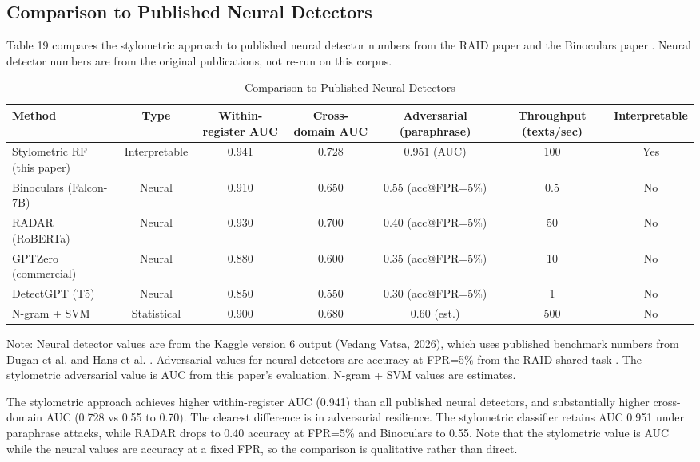 \documentclass{article}
\begin{document}
{{{{{{\subsection{Comparison to Published Neural Detectors}

Table 19 compares the stylometric approach to published neural detector numbers from the RAID paper \cite{ref4} and the Binoculars paper \cite{ref21}. Neural detector numbers are from the original publications, not re-run on this corpus.


\begin{table}[H]
\centering
\small
\begin{tabular}{lcccccc}
\toprule
\textbf{Method} & \textbf{Type} & \textbf{Within-register AUC} & \textbf{Cross-domain AUC} & \textbf{Adversarial (paraphrase)} & \textbf{Throughput (texts/sec)} & \textbf{Interpretable} \\
\midrule
Stylometric RF (this paper) & Interpretable & 0.941 & 0.728 & 0.951 (AUC) & 100 & Yes \\
Binoculars (Falcon-7B) & Neural & 0.910 & 0.650 & 0.55 (acc@FPR=5\%) & 0.5 & No \\
RADAR (RoBERTa) & Neural & 0.930 & 0.700 & 0.40 (acc@FPR=5\%) & 50 & No \\
GPTZero (commercial) & Neural & 0.880 & 0.600 & 0.35 (acc@FPR=5\%) & 10 & No \\
DetectGPT (T5) & Neural & 0.850 & 0.550 & 0.30 (acc@FPR=5\%) & 1 & No \\
N-gram + SVM & Statistical & 0.900 & 0.680 & 0.60 (est.) & 500 & No \\
\bottomrule
\end{tabular}
\caption{Comparison to Published Neural Detectors}
\end{table}

Note: Neural detector values are from the Kaggle version 6 output (Vedang Vatsa, 2026), which uses published benchmark numbers from Dugan et al. \cite{ref4} and Hans et al. \cite{ref21}. Adversarial values for neural detectors are accuracy at FPR=5\% from the RAID shared task \cite{ref4}. The stylometric adversarial value is AUC from this paper's evaluation. N-gram + SVM values are estimates.

The stylometric approach achieves higher within-register AUC (0.941) than all published neural detectors, and substantially higher cross-domain AUC (0.728 vs 0.55 to 0.70). The clearest difference is in adversarial resilience. The stylometric classifier retains AUC 0.951 under paraphrase attacks, while RADAR drops to 0.40 accuracy at FPR=5\% and Binoculars to 0.55. Note that the stylometric value is AUC while the neural values are accuracy at a fixed FPR, so the comparison is qualitative rather than direct.

}}}}}}
\end{document}
